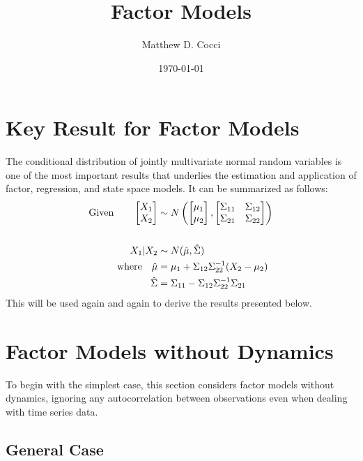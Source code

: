 \documentclass[12pt]{article}
\author{Matthew D. Cocci}
\title{Factor Models}
\date{\today}
\theoremstyle{plain}
\theoremstyle{definition}
\theoremstyle{remark}
\begin{document}
\maketitle

\tableofcontents 

\clearpage
\section{Key Result for Factor Models}

The conditional distribution of jointly multivariate normal random variables is
one of the most important results that underlies the estimation and application
of factor, regression, and state space models. It can be summarized as follows:
\begin{align}
  \text{Given} \qquad 
    \begin{bmatrix} X_1 \\ X_2 \end{bmatrix}
    &\sim 
    N\left(
    \begin{bmatrix} \mu_1 \\ \mu_2 \end{bmatrix},
    \begin{bmatrix} 
      \Sigma_{11} & \Sigma_{12} \\
      \Sigma_{21} & \Sigma_{22} 
    \end{bmatrix} 
    \right) \notag\\
    \label{reg} \\
  X_1 | X_2 &\sim N(\hat{\mu}, \hat{\Sigma})  \notag\\
  \text{where} \quad
  \hat{\mu} &= \mu_1 + \Sigma_{12} \Sigma^{-1}_{22} 
    (X_2-\mu_2) \notag\\
  \hat{\Sigma} &= \Sigma_{11} - \Sigma_{12} \Sigma^{-1}_{22} 
    \Sigma_{21}\notag
\end{align}
This will be used again and again to derive the results presented below.

\section{Factor Models without Dynamics}

To begin with the simplest case, this section considers factor models
without dynamics, ignoring any autocorrelation between observations even
when dealing with time series data.

\subsection{General Case}
\end{document}

